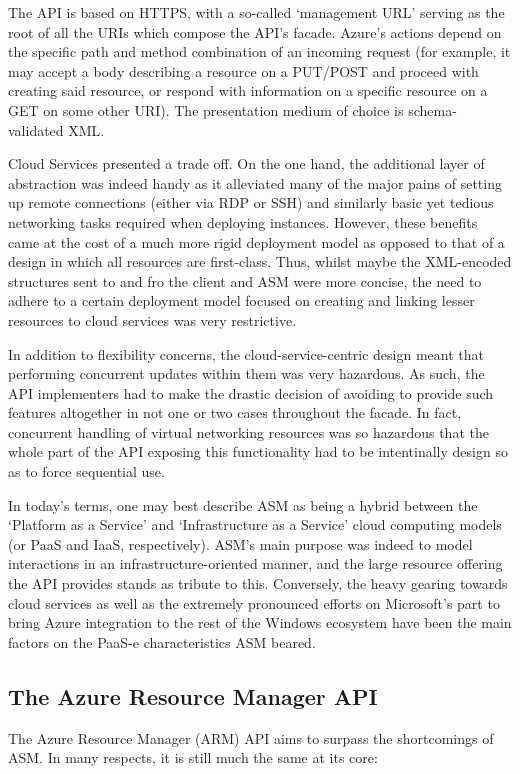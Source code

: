 \documentclass[11pt]{article}
\begin{document}
The API is based on HTTPS, with a so-called `management URL' serving as the
root of all the URIs which compose the API's facade. Azure's actions depend
on the specific path and method combination of an incoming request (for
example, it may accept a body describing a resource on a PUT/POST and
proceed with creating said resource, or respond with information on a
specific resource on a GET on some other URI). The presentation medium of
choice is schema-validated XML\@.

Cloud Services presented a trade off. On the one hand, the additional layer of
abstraction was indeed handy as it alleviated many of the major pains of
setting up remote connections (either via RDP or SSH) and similarly basic yet
tedious networking tasks required when deploying instances. However, these
benefits came at the cost of a much more rigid deployment model as opposed to
that of a design in which all resources are first-class. Thus, whilst maybe the
XML-encoded structures sent to and fro the client and ASM were more concise,
the need to adhere to a certain deployment model focused on creating and
linking lesser resources to cloud services was very restrictive.

In addition to flexibility concerns, the cloud-service-centric design meant
that performing concurrent updates within them was very hazardous. As such, the
API implementers had to make the drastic decision of avoiding to provide such
features altogether in not one or two cases throughout the facade. In fact,
concurrent handling of virtual networking resources was so hazardous that the
whole part of the API exposing this functionality had to be intentinally design
so as to force sequential use. %

In today's terms, one may best describe ASM as being a hybrid between the
`Platform as a Service' and `Infrastructure as a Service' cloud computing models
(or PaaS and IaaS, respectively). ASM's main purpose was indeed to model
interactions in an infrastructure-oriented manner, and the large resource
offering the API provides stands as tribute to this. Conversely, the heavy
gearing towards cloud services as well as the extremely pronounced efforts on
Microsoft's part to bring Azure integration to the rest of the Windows
ecosystem have been the main factors on the PaaS-e characteristics ASM beared.

\subsection{The Azure Resource Manager API}
The Azure Resource Manager (ARM) API aims to surpass the shortcomings of ASM\@.
In many respects, it is still much the same at its core: %
\end{document}
